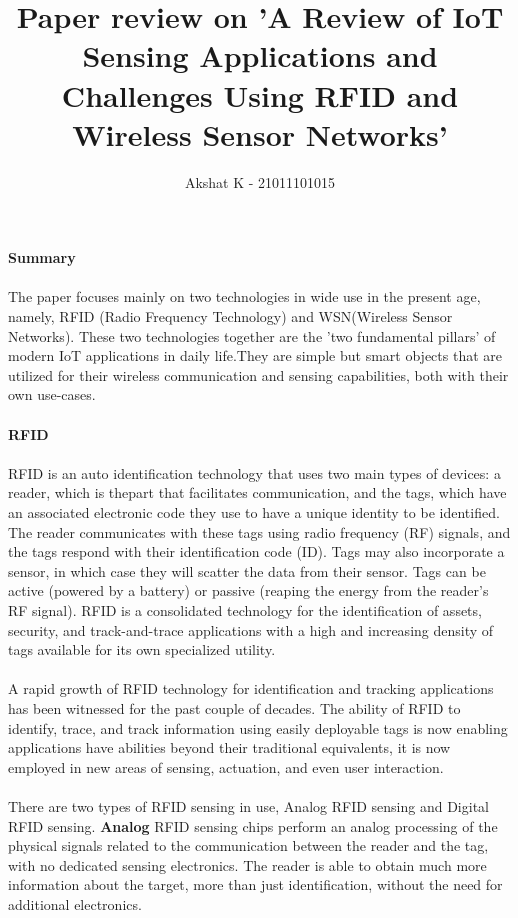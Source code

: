 \documentclass[12pt, letterpaper]{article}
\title{Paper review on 'A Review of IoT Sensing Applications and Challenges
Using RFID and Wireless Sensor Networks'}
\author{Akshat K - 21011101015}
\begin{document}
\maketitle
\textbf{Summary}
\\ \ \\
The paper focuses mainly on two technologies in wide use in the present age, namely, RFID (Radio Frequency Technology)
and WSN(Wireless Sensor Networks). These two technologies together are the 'two fundamental pillars' of modern IoT applications 
in daily life.They are simple but smart objects that are utilized for their wireless communication and sensing capabilities, both 
with their own use-cases.
\\ \ \\
\textbf{RFID}
\\ \ \\
RFID is an auto identification technology that uses two main types of devices: a reader, which is
thepart that facilitates communication, and the tags, which have an associated electronic code they use 
to  have a unique identity to be identified. The reader communicates with these tags using radio frequency (RF) signals,
and the tags respond with their identification code (ID). Tags may also incorporate a sensor, in which
case they will scatter the data from their sensor. Tags can be active (powered by a battery) or
passive (reaping the energy from the reader's RF signal). RFID is a consolidated technology for the
identification of assets, security, and track-and-trace applications with a high and increasing density of
tags available for its own specialized utility.
\\ \ \\
A rapid growth of RFID technology for identification and tracking
applications has been witnessed for the past couple of decades. The ability of RFID to 
identify, trace, and track information using easily deployable tags is
now enabling applications have abilities beyond their traditional equivalents, it is now employed
in new areas of sensing, actuation, and even user interaction.
\\ \ \\
There are two types of RFID sensing in use, Analog RFID sensing and Digital RFID sensing.
\textbf{Analog} RFID sensing chips perform an analog processing of the physical signals related
to the communication between the reader and the tag, with no dedicated sensing electronics.
The reader is able to obtain much more information about the target, more than just identification,
without the need for additional electronics.  
\end{document}
